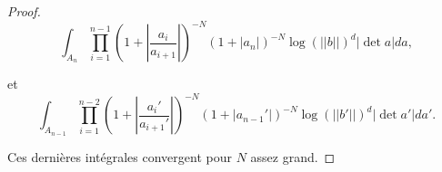 \documentclass{amsart}
\begin{document}
\begin{proof}
 \begin{equation}
 \int_{A_n}  \prod_{i=1}^{n-1} (1+ |\frac{a_i}{a_{i+1}}|)^{-N} (1+|a_n|)^{-N}\log(||b||)^d|\det a| da,
 \end{equation}
 
 et
 \begin{equation}
 \int_{A_{n-1}}  \prod_{i=1}^{n-2} (1+ |\frac{a_i'}{a_{i+1}'}|)^{-N} (1+|a_{n-1}'|)^{-N}\log(||b'||)^d|\det a'|da'.
 \end{equation}
 
Ces dernières intégrales convergent pour $N$ assez grand.

\end{proof}
\end{document}
